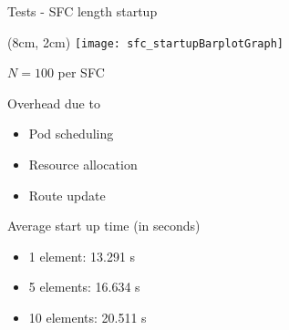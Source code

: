 \begin{frame}{Tests - SFC length startup}

  \begin{textblock*}{5cm}(8cm, 2cm)
    \texttt{[image: sfc\_startupBarplotGraph]}
  \end{textblock*}

  \vspace*{1cm}

  \noindent $N = 100$ per SFC \newline

  \noindent Overhead due to
  \begin{itemize}
  \item Pod scheduling
  \item Resource allocation
  \item Route update
  \end{itemize}

  \vspace*{1cm}

  Average start up time (in seconds)
  \begin{multicols}{2}
    \begin{itemize}
    \item 1 element: 13.291 s
    \item 5 elements: 16.634 s
    \item 10 elements: 20.511 s
    \end{itemize}
  \end{multicols}

  \vfill
\end{frame}

